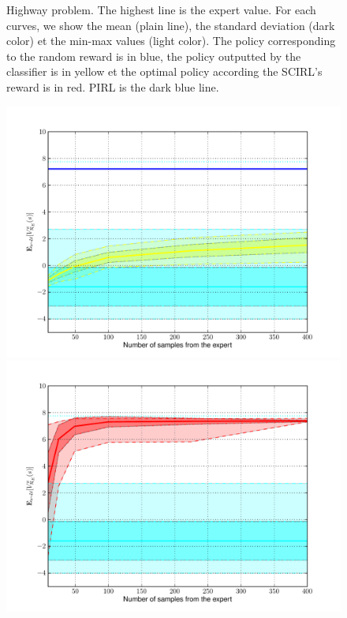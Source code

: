 \documentclass[english,utf8]{./hermes-journal}
\begin{document}
\begin{figure}[fig:res]{Highway problem. The highest line is the expert value. For each curves, we show the mean (plain line), the standard deviation (dark color) et the min-max values (light color). The policy corresponding to the random reward is in blue, the policy outputted by the  classifier is in yellow et the optimal policy according the SCIRL's reward is in red. PIRL is the dark blue line.}
\begin{minipage}[l]{0.45\linewidth}
\centering
  \centerline{\includegraphics[width=.92\linewidth]{fig_classif.pdf}}
\end{minipage} \hfill
\begin{minipage}[r]{0.45\linewidth}
\centering
  \centerline{\includegraphics[width=.92\linewidth]{fig_scirl.pdf}}
\end{minipage}
\end{figure}
\end{document}
